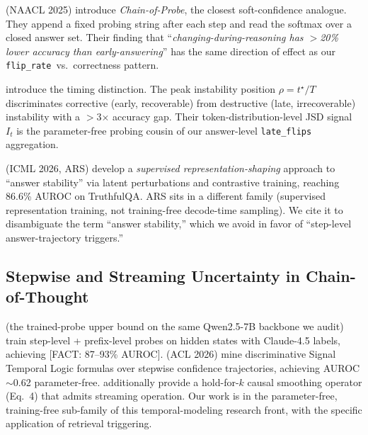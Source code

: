 \documentclass[11pt]{article}
\newcommand{\FACT}[1]{{\color{blue}\textsf{[FACT: #1]}}}
\begin{document}
\cite{Wang_ChainOfProbeCoTStepByStep} (NAACL 2025) introduce
\emph{Chain-of-Probe}, the closest soft-confidence analogue. They append a
fixed probing string after each step and read the softmax over a closed
answer set. Their finding that ``\textit{changing-during-reasoning has $>$20\%
lower accuracy than early-answering}'' has the same direction of effect as
our \texttt{flip\_rate}~vs.\ correctness pattern.

\cite{Chen_DynamicInstabilityLLMReasoning} introduce the timing distinction.
The peak instability position $\rho = t^\star / T$ discriminates corrective
(early, recoverable) from destructive (late, irrecoverable) instability with
a $>$3$\times$ accuracy gap. Their token-distribution-level JSD signal $I_t$
is the parameter-free probing cousin of our answer-level \texttt{late\_flips}
aggregation.

\cite{Zhang_AnswerAgreementRepresentationShaping} (ICML 2026, ARS) develop a
\emph{supervised representation-shaping} approach to ``answer stability'' via
latent perturbations and contrastive training, reaching 86.6\% AUROC on
TruthfulQA. ARS sits in a different family (supervised representation
training, not training-free decode-time sampling). We cite it to
disambiguate the term ``answer stability,'' which we avoid in favor of
``step-level answer-trajectory triggers.''

\subsection{Stepwise and Streaming Uncertainty in Chain-of-Thought}
\label{sec:related-streaming}

\cite{Lu_StreamingHallucinationDetectionCoT} (the trained-probe upper bound on
the same Qwen2.5-7B backbone we audit) train step-level + prefix-level probes
on hidden states with Claude-4.5 labels, achieving \FACT{87--93\% AUROC}.
\cite{Mao_ConfidenceOverTimeSTL} (ACL 2026) mine discriminative Signal
Temporal Logic formulas over stepwise confidence trajectories, achieving
AUROC $\sim$0.62 parameter-free.
\cite{Datta_DecideEarlyExplainLater} additionally provide a hold-for-$k$
causal smoothing operator (Eq.~4) that admits streaming operation. Our work
is in the parameter-free, training-free sub-family of this temporal-modeling
research front, with the specific application of retrieval triggering.
\end{document}
